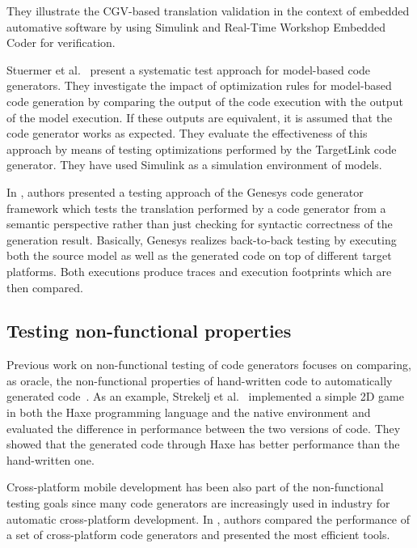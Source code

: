 They illustrate the CGV-based translation validation in the context of embedded automative software by using Simulink and Real-Time Workshop Embedded Coder for verification.








Stuermer et al.~\cite{stuermer2007systematic} present a systematic test approach for model-based code generators. They investigate the impact of optimization rules for model-based code generation by comparing the output of the code execution with the output of the model execution. 
If these outputs are equivalent, it is assumed that the code generator works as expected. 
They evaluate the effectiveness of this approach by means of testing optimizations performed by the TargetLink code generator. 
They have used Simulink as a simulation environment of models. 




In \cite{jorges2014back}, authors presented a testing approach of the Genesys code generator framework which tests the translation performed by a code generator from a semantic perspective rather than just checking for syntactic correctness of the generation result. Basically,
Genesys realizes back-to-back testing by executing both the source model as well as the generated code on top of different target platforms. Both executions produce traces and execution footprints which are then compared.



\subsection{Testing non-functional properties}
Previous work on non-functional testing of code generators focuses on comparing, as oracle, the non-functional properties of hand-written code to automatically generated code~\cite{stepasyuk2015evaluating,richard2013efficient}. As an example, Strekelj et al.~\cite{vstrekelj2015performance} implemented a simple 2D game in both the Haxe programming language and the native environment and evaluated the difference in performance between the two versions of code. They showed that the generated code through Haxe has better performance than the hand-written one. 

Cross-platform mobile development has been also part of the non-functional testing goals since many code generators are increasingly used in industry for automatic cross-platform development. In \cite{pazirandeh2015evaluation,hartmann2011cross}, authors compared the performance of a set of cross-platform code generators and presented the most efficient tools.
